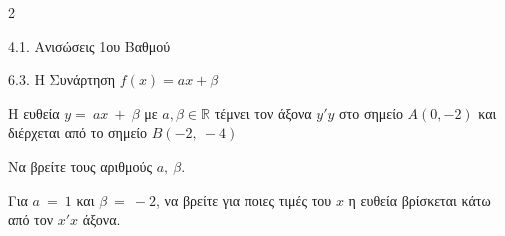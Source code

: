 \begin{ylh}{2}
    \item 4.1. Ανισώσεις 1ου Βαθμού
    \item 6.3. Η Συνάρτηση $f(x)=ax+\beta$
\end{ylh}
Η ευθεία $y = \ a x\  + \ \beta$ με $a,\beta\mathbb{\in R}$ τέμνει τον άξονα $y'y$ στο σημείο $A(0, - 2)$ και διέρχεται από το σημείο $B( - 2,\  - 4)\ $
\begin{alist}
\item Να βρείτε τους αριθμούς $a,\ \beta.$
\item Για $a\  = \ 1$ και $\beta\  = \  - 2$, να βρείτε για ποιες τιμές του $x$ η ευθεία βρίσκεται κάτω από τον $x'x$ άξονα.$\ \ \ \ \ \ \ \ $
\end{alist}

